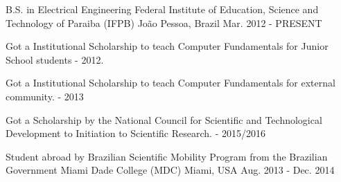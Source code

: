 

\begin{cventries}

  \cventry
    {B.S. in Electrical Engineering} %
    {Federal Institute of Education, Science and Technology of Paraiba (IFPB)} %
    {João Pessoa, Brazil} %
    {Mar. 2012 - PRESENT} %
    {
      \begin{cvitems} %
        \item {Got a Institutional Scholarship to teach Computer Fundamentals for Junior School students - 2012.}
        \item {Got a Institutional Scholarship to teach Computer Fundamentals for external community. - 2013}
        \item {Got a Scholarship by the National Council for Scientific and Technological Development to Initiation to Scientific Research. - 2015/2016}
      \end{cvitems}
    }
    
    \cventry
    {Student abroad by Brazilian Scientific Mobility Program from the Brazilian Government} %
    {Miami Dade College (MDC)} %
    {Miami, USA} %
    {Aug. 2013 - Dec. 2014} %
    {
    }

\end{cventries}
